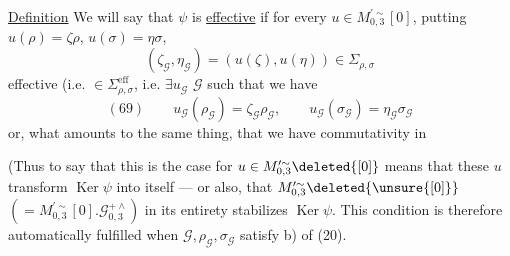 
\uline{Definition} We will say that $\psi$ is \uline{effective} if for every
$u\in M_{0,3}^{\prime\sim}[0]$, putting $u(\rho)=\zeta\rho$, $u(\sigma)=\eta\sigma$,
\[
 (\zeta_{\mathcal{G}},\eta_{\mathcal{G}})
 =(u(\zeta),u(\eta))\in\Sigma_{\rho,\sigma}
\]
effective (i.e. $\in\Sigma_{\rho,\sigma}^{\mathrm{eff}}$, i.e. $\exists u_{\mathcal{G}}$  $\mathcal{G}$ such that we have 
\[
 (69)\qquad
 u_{\mathcal{G}}(\rho_{\mathcal{G}})=\zeta_{\mathcal{G}}\rho_{\mathcal{G}},
 \qquad
 u_{\mathcal{G}}(\sigma_{\mathcal{G}})=\eta_{\mathcal{G}}\sigma_{\mathcal{G}}
\]
or, what amounts to the same thing, that we have commutativity in

(Thus to say that this is the case for  $u\in M_{0,3}^{\prime\sim}\deleted{[0]}$ means that these $u$ transform $\operatorname{Ker}\psi$ into itself --- or also, that
$M_{0,3}^{\prime\sim}\deleted{\unsure{[0]}}$
$(=M_{0,3}^{\prime\sim}[0].\mathcal{G}_{0,3}^{+\wedge})$ in its entirety stabilizes $\operatorname{Ker}\psi$.
 This condition is therefore automatically fulfilled when $\mathcal{G},\rho_{\mathcal{G}},\sigma_{\mathcal{G}}$ satisfy  b) of (20).


